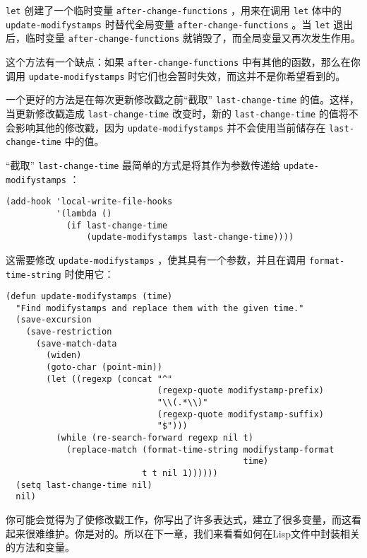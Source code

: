 \texttt{let} 创建了一个临时变量 \texttt{after-change-functions} ，用来在调用 \texttt{let} 体中的 \texttt{update-modifystamps} 时替代全局变量 \texttt{after-change-functions} 。当 \texttt{let} 退出后，临时变量 \texttt{after-change-functions} 就销毁了，而全局变量又再次发生作用。

这个方法有一个缺点：如果 \texttt{after-change-functions} 中有其他的函数，那么在你调用 \texttt{update-modifystamps} 时它们也会暂时失效，而这并不是你希望看到的。

一个更好的方法是在每次更新修改戳之前“截取” \texttt{last-change-time} 的值。这样，当更新修改戳造成 \texttt{last-change-time} 改变时，新的 \texttt{last-change-time} 的值将不会影响其他的修改戳，因为 \texttt{update-modifystamps} 并不会使用当前储存在 \texttt{last-change-time} 中的值。

“截取” \texttt{last-change-time} 最简单的方式是将其作为参数传递给 \texttt{update-modifystamps} ：

\begin{verbatim}
(add-hook 'local-write-file-hooks
          '(lambda ()
            (if last-change-time
                (update-modifystamps last-change-time))))
\end{verbatim}

这需要修改 \texttt{update-modifystamps} ，使其具有一个参数，并且在调用 \texttt{format-time-string} 时使用它：

\begin{verbatim}
(defun update-modifystamps (time)
  "Find modifystamps and replace them with the given time."
  (save-excursion
    (save-restriction
      (save-match-data
        (widen)
        (goto-char (point-min))
        (let ((regexp (concat "^"
                              (regexp-quote modifystamp-prefix)
                              "\\(.*\\)"
                              (regexp-quote modifystamp-suffix)
                              "$")))
          (while (re-search-forward regexp nil t)
            (replace-match (format-time-string modifystamp-format
                                               time)
                           t t nil 1))))))
  (setq last-change-time nil)
  nil)
\end{verbatim}

你可能会觉得为了使修改戳工作，你写出了许多表达式，建立了很多变量，而这看起来很难维护。你是对的。所以在下一章，我们来看看如何在Lisp文件中封装相关的方法和变量。
